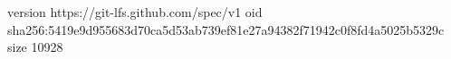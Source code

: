 version https://git-lfs.github.com/spec/v1
oid sha256:5419e9d955683d70ca5d53ab739ef81e27a94382f71942c0f8fd4a5025b5329c
size 10928
